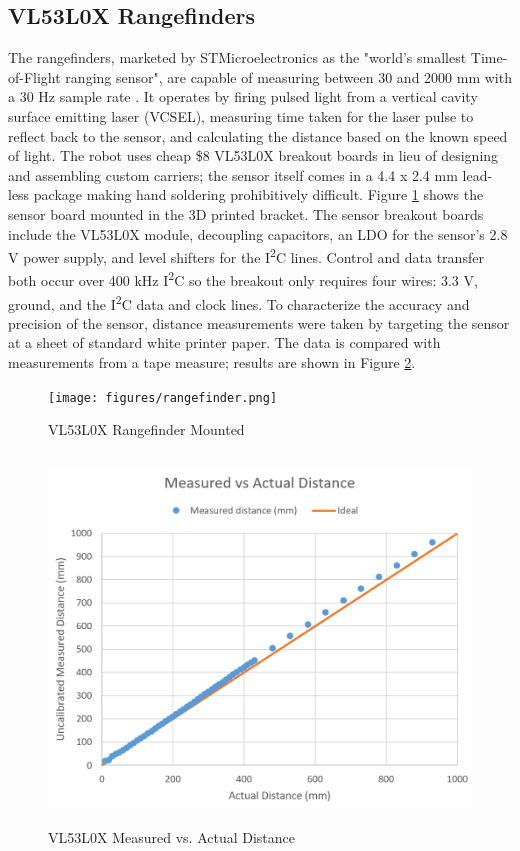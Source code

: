 \subsection{VL53L0X Rangefinders}
The rangefinders, marketed by STMicroelectronics as the "world's smallest Time-of-Flight ranging sensor", are capable of measuring between 30 and 2000 mm with a 30 Hz sample rate \cite{vl53l0x}. It operates by firing pulsed light from a vertical cavity surface emitting laser (VCSEL), measuring time taken for the laser pulse to reflect back to the sensor, and calculating the distance based on the known speed of light. The robot uses cheap \$8 VL53L0X breakout boards in lieu of designing and assembling custom carriers; the sensor itself comes in a 4.4 x 2.4 mm lead-less package making hand soldering prohibitively difficult. Figure \ref{fig:rangefinder} shows the sensor board mounted in the 3D printed bracket. The sensor breakout boards include the VL53L0X module, decoupling capacitors, an LDO for the sensor's 2.8 V power supply, and level shifters for the I\textsuperscript{2}C lines. Control and data transfer both occur over 400 kHz I\textsuperscript{2}C so the breakout only requires four wires: 3.3 V, ground, and the I\textsuperscript{2}C data and clock lines. To characterize the accuracy and precision of the sensor, distance measurements were taken by targeting the sensor at a sheet of standard white printer paper. The data is compared with measurements from a tape measure; results are shown in Figure \ref{fig:rangefinder_measurement}. 

\begin{figure}[H]   %
	\centering \texttt{[image: figures/rangefinder.png]}
	\caption{VL53L0X Rangefinder Mounted}\label{fig:rangefinder}
\end{figure}

\begin{figure}[H]   %
	\centering \includegraphics[width=6in, height=3.85in, keepaspectratio]{figures/rangefinder_measurement.png}
	\caption{VL53L0X Measured vs. Actual Distance}\label{fig:rangefinder_measurement}
\end{figure}

